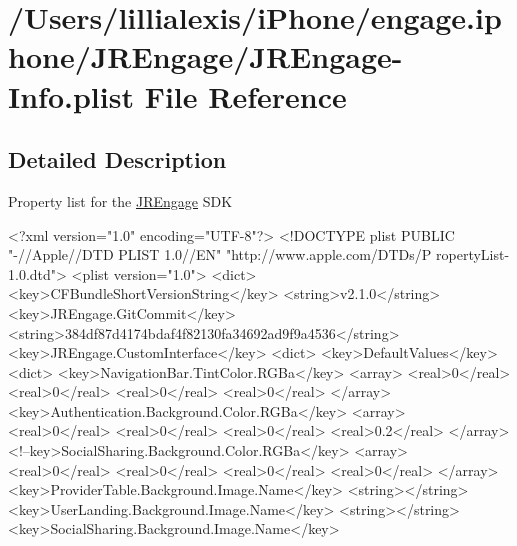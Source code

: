 \hypertarget{_j_r_engage-_info_8plist}{
\section{/Users/lillialexis/iPhone/engage.iphone/JREngage/JREngage-\/Info.plist File Reference}
\label{_j_r_engage-_info_8plist}
}


\subsection{Detailed Description}
Property list for the \hyperlink{interface_j_r_engage}{JREngage} SDK 
\begin{DoxyCodeInclude}
<?xml version="1.0" encoding="UTF-8"?>
<!DOCTYPE plist PUBLIC "-//Apple//DTD PLIST 1.0//EN" "http://www.apple.com/DTDs/P
      ropertyList-1.0.dtd">
<plist version="1.0">
<dict>
        <key>CFBundleShortVersionString</key>
        <string>v2.1.0</string>
        <key>JREngage.GitCommit</key>
        <string>384df87d4174bdaf4f82130fa34692ad9f9a4536</string>
        <key>JREngage.CustomInterface</key>
        <dict>
                <key>DefaultValues</key>
                <dict>
                        <key>NavigationBar.TintColor.RGBa</key>
                        <array>
                                <real>0</real>
                                <real>0</real>
                                <real>0</real>
                                <real>0</real>
                        </array>
                        <key>Authentication.Background.Color.RGBa</key>
                        <array>
                                <real>0</real>
                                <real>0</real>
                                <real>0</real>
                                <real>0.2</real>
                        </array>
                        <!--key>SocialSharing.Background.Color.RGBa</key>
                                <array>
                                        <real>0</real>
                                        <real>0</real>
                                        <real>0</real>
                                        <real>0</real>
                                </array>
                        <key>ProviderTable.Background.Image.Name</key>
                        <string></string>
                        <key>UserLanding.Background.Image.Name</key>
                        <string></string>
                        <key>SocialSharing.Background.Image.Name</key>

\end{DoxyCodeInclude}
